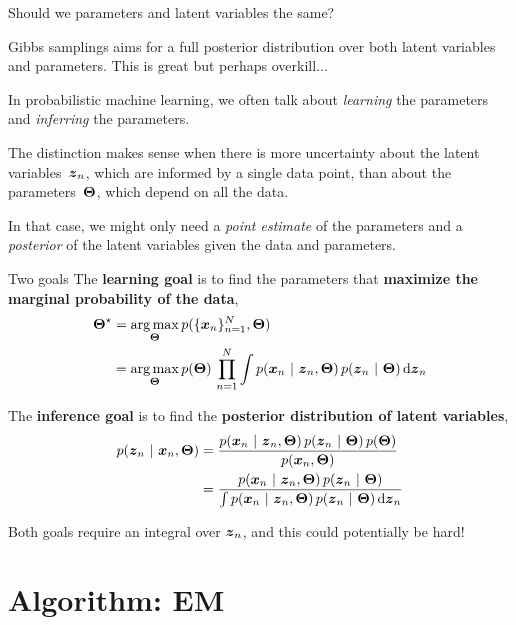 \documentclass[aspectratio=169]{beamer}
\begin{document}
\begin{frame}{Should we parameters and latent variables the same?}

Gibbs samplings aims for a full posterior distribution over both latent variables and parameters. This is great but perhaps overkill...

In probabilistic machine learning, we often talk about \textit{learning} the parameters and \textit{inferring} the parameters. 

The distinction makes sense when there is more uncertainty about the latent variables~$\boldsymbol{z}_n$, which are informed by a single data point, than about the parameters~$\boldsymbol{\Theta}$, which depend on all the data. 

In that case, we might only need a \textit{point estimate} of the parameters and a \textit{posterior} of the latent variables given the data and parameters.
\end{frame}

\begin{frame}{Two goals}
The \textbf{learning goal} is to find the parameters that \textbf{maximize the marginal probability of the data},
\begin{align}
    \boldsymbol{\Theta}^\star 
    &= \operatorname*{arg\,max}_{\boldsymbol{\Theta}} p(\{\boldsymbol{x}_n\}_{n=1}^N, \boldsymbol{\Theta})\\
    &= \operatorname*{arg\,max}_{\boldsymbol{\Theta}} p(\boldsymbol{\Theta}) \, \prod_{n=1}^N \int p(\boldsymbol{x}_n ~\vert~ \boldsymbol{z}_n, \boldsymbol{\Theta}) \, p(\boldsymbol{z}_n ~\vert~ \boldsymbol{\Theta}) \mathop{}\!\mathrm{d} \boldsymbol{z}_n
\end{align}

The \textbf{inference goal} is to find the \textbf{posterior distribution of latent variables},
\begin{align}
    p(\boldsymbol{z}_n ~\vert~ \boldsymbol{x}_n, \boldsymbol{\Theta}) 
    &= \frac{p(\boldsymbol{x}_n ~\vert~ \boldsymbol{z}_n, \boldsymbol{\Theta}) \, p(\boldsymbol{z}_n ~\vert~ \boldsymbol{\Theta}) \, p(\boldsymbol{\Theta})}{p(\boldsymbol{x}_n, \boldsymbol{\Theta})} \\
    &= \frac{p(\boldsymbol{x}_n ~\vert~ \boldsymbol{z}_n, \boldsymbol{\Theta}) \, p(\boldsymbol{z}_n ~\vert~ \boldsymbol{\Theta})}{\int p(\boldsymbol{x}_n ~\vert~ \boldsymbol{z}_n, \boldsymbol{\Theta}) \, p(\boldsymbol{z}_n ~\vert~ \boldsymbol{\Theta})\mathop{}\!\mathrm{d} \boldsymbol{z}_n}
\end{align}

Both goals require an integral over $\boldsymbol{z}_n$, and this could potentially be hard!
\end{frame}


\section{Algorithm: EM}
\label{sec:em}
\end{document}
